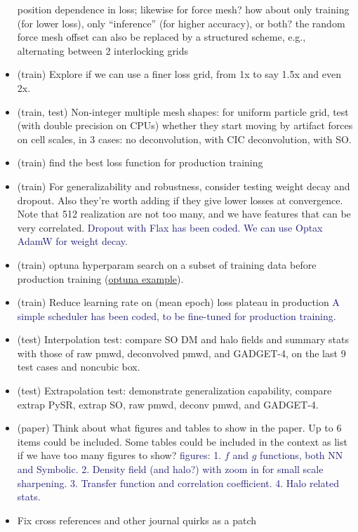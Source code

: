 \documentclass[modern, trackchanges, dvipsnames]{aastex631}
\newcommand{\GADGET}{{{\fontsize{10pt}{12pt}\selectfont GADGET}-4}}
\newcommand{\YZ}[1]{\textcolor{MidnightBlue}{#1}}
\begin{document}
\begin{itemize}
  position dependence in loss; likewise for force mesh? how about only
  training (for lower loss), only ``inference'' (for higher accuracy),
  or both? the random force mesh offset can also be replaced by a
  structured scheme, e.g., alternating between 2 interlocking grids
\item (train) Explore if we can use a finer loss grid, from 1x to say
  1.5x and even 2x.
\item (train, test) Non-integer multiple mesh shapes: for uniform
  particle grid, test (with double precision on CPUs) whether they start
  moving by artifact forces on cell scales, in 3 cases: no
  deconvolution, with CIC deconvolution, with SO.
\item (train) find the best loss function for production training
\item (train) For generalizability and robustness, consider testing
  weight decay and dropout. Also they're worth adding if they give lower
  losses at convergence. Note that 512 realization are not too many, and
  we have features that can be very correlated.\newline
  \YZ{Dropout with Flax has been coded. We can use Optax AdamW for weight decay.}
\item (train) optuna hyperparam search on a subset of training data
  before production training
  (\href{https://github.com/optuna/optuna-examples/blob/main/haiku/haiku_simple.py}{optuna
  example}).
\item (train) Reduce learning rate on (mean epoch) loss plateau in
  production\newline
  \YZ{A simple scheduler has been coded, to be fine-tuned for production training.}
\item (test) Interpolation test: compare SO DM and halo fields and
  summary stats with those of raw pmwd, deconvolved pmwd, and \GADGET,
  on the last 9 test cases and noncubic box.
\item (test) Extrapolation test: demonstrate generalization capability,
  compare extrap PySR, extrap SO, raw pmwd, deconv pmwd, and \GADGET.
\item (paper) Think about what figures and tables to show in the paper. Up
to 6 items could be included. Some tables could be included in the context as
list if we have too many figures to show?\newline
  \YZ{figures:
  1. $f$ and $g$ functions, both NN and Symbolic.
  2. Density field (and halo?) with zoom in for small scale sharpening.
  3. Transfer function and correlation coefficient.
  4. Halo related stats.}
\item Fix cross references and other journal quirks as a patch
\end{itemize}
\end{document}
